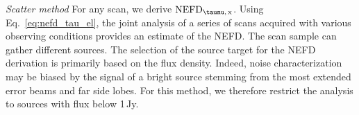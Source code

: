 \noindent \emph{Scatter method} %
For any scan, we derive $\rm{NEFD}_{\taunu,\, x}$.
Using Eq.~\ref{eq:nefd_tau_el}, the joint analysis of a series of
scans acquired with various observing conditions provides an estimate
of the NEFD. The scan sample can gather different sources. 
The selection of the source target for the NEFD derivation is
primarily based on the flux density. Indeed, noise
characterization may be biased {\lp by the signal of a bright source
stemming from the most extended error beams and far side lobes.}
For this method, we therefore restrict the analysis to sources with flux below 1\,Jy.



